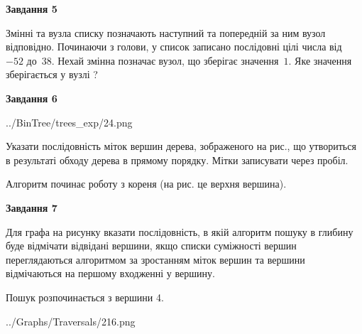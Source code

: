 \documentclass[12pt, ukrainian]{article}
\begin{document}
{\begin {large}
{\begin {center}\textbf{Завдання 5}\end {center}}\par
Змінні  та  вузла списку позначають наступний та попередній за ним вузол відповідно. Починаючи з голови, у список записано послідовні цілі числа від~$-52$ до~$38$. Нехай змінна  позначає вузол, що зберігає значення~$1$.
Яке значення зберігається у вузлі  ?\par
\newpage

{\begin {center}\textbf{Завдання 6}\end {center}}\par

\begin{center}
	{../BinTree/trees_exp/24.png}
\end{center}
Указати послідовність міток вершин дерева, зображеного на рис., що утвориться в результаті обходу дерева в прямому порядку. Мітки записувати через пробіл.\par Алгоритм починає роботу з кореня (на рис. це верхня вершина).\par
\newpage

{\begin {center}\textbf{Завдання 7}\end {center}}\par
Для графа на рисунку вказати послідовність, в якій алгоритм пошуку в глибину буде відмічати відвідані вершини, якщо списки суміжності вершин переглядаються алгоритмом за зростанням міток вершин та вершини відмічаються на першому вход\-женні у вершину.\par
Пошук розпочинається з вершини 4.\par

\begin{center}
	{../Graphs/Traversals/216.png}
\end{center}\par
\newpage


\end{large}}
\end{document}

